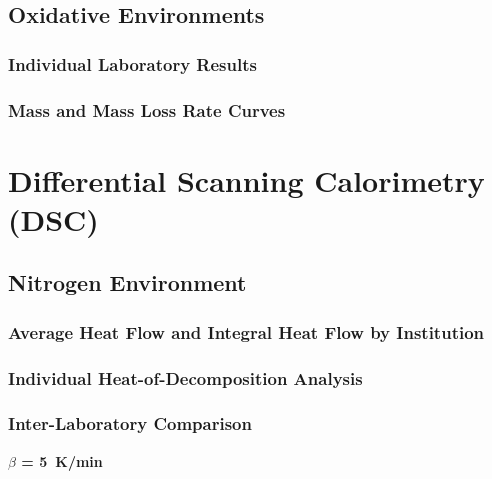 \newpage

\subsection{Oxidative Environments}
\label{TGA_O2}

\subsubsection{Individual Laboratory Results}



\newpage

\subsubsection{Mass and Mass Loss Rate Curves}



\newpage


\section{Differential Scanning Calorimetry (DSC)}

\subsection{Nitrogen Environment}
\label{DSC_N2}

\subsubsection{Average Heat Flow and Integral Heat Flow by Institution}



\subsubsection{Individual Heat-of-Decomposition Analysis}




\subsubsection{Inter-Laboratory Comparison}

\noindent\textbf{$\beta$ = 5~K/min}\par\vspace{0.5em}

